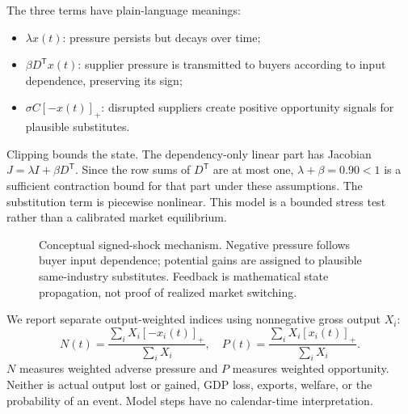 \documentclass[conference,a4paper,twoside]{IEEEtran}
\begin{document}
The three terms have plain-language meanings:
\begin{itemize}
\item $\lambda x(t)$: pressure persists but decays over time;
\item $\beta D^{\mathsf T}x(t)$: supplier pressure is transmitted to buyers according to input dependence, preserving its sign;
\item $\sigma C[-x(t)]_+$: disrupted suppliers create positive opportunity signals for plausible substitutes.
\end{itemize}
Clipping bounds the state. The dependency-only linear part has Jacobian $J=\lambda I+\beta D^{\mathsf T}$. Since the row sums of $D^{\mathsf T}$ are at most one, $\lambda+\beta=0.90<1$ is a sufficient contraction bound for that part under these assumptions. The substitution term is piecewise nonlinear. This model is a bounded stress test rather than a calibrated market equilibrium.

\begin{figure}[t]
\centering
{}
\caption{Conceptual signed-shock mechanism. Negative pressure follows buyer input dependence; potential gains are assigned to plausible same-industry substitutes. Feedback is mathematical state propagation, not proof of realized market switching.}
\label{fig:signed}
\end{figure}

We report separate output-weighted indices using nonnegative gross output $X_i$:
\begin{equation}
N(t)=\frac{\sum_i X_i[-x_i(t)]_+}{\sum_i X_i},\quad P(t)=\frac{\sum_i X_i[x_i(t)]_+}{\sum_i X_i}.
\label{eq:indices}
\end{equation}
$N$ measures weighted adverse pressure and $P$ measures weighted opportunity. Neither is actual output lost or gained, GDP loss, exports, welfare, or the probability of an event. Model steps have no calendar-time interpretation.
\end{document}
